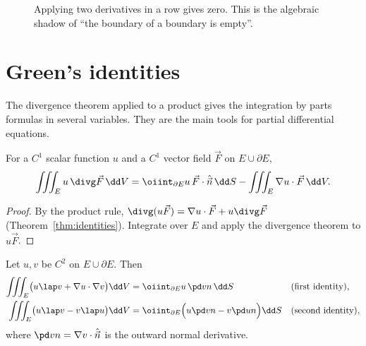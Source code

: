 \begin{figure}[ht]
\centering
{}
\caption{Applying two derivatives in a row gives zero. This is the algebraic shadow of ``the boundary of a boundary is empty''.}
\label{fig:dd0}
\end{figure}

\section{Green's identities}

The divergence theorem applied to a product gives the integration by parts formulas in several variables. They are the main tools for partial differential equations.

\begin{theorem}\label{thm:ibp}
For a $C^1$ scalar function $u$ and a $C^1$ vector field $\vec F$ on $E\cup\partial E$,
\[
\iiint_Eu\,\divg\vec F\,\dd V=\oiint_{\partial E}u\,\vec F\cdot\hat{\vec n}\,\dd S-\iiint_E\nabla u\cdot\vec F\,\dd V .
\]
\end{theorem}

\begin{proof}
By the product rule, $\divg(u\vec F)=\nabla u\cdot\vec F+u\divg\vec F$ (Theorem~\ref{thm:identities}). Integrate over $E$ and apply the divergence theorem to $u\vec F$.
\end{proof}

\begin{theorem}\label{thm:greenid}
Let $u,v$ be $C^2$ on $E\cup\partial E$. Then
\begin{align}
\iiint_E\bigl(u\lap v+\nabla u\cdot\nabla v\bigr)\dd V&=\oiint_{\partial E}u\,\pd vn\,\dd S&&\text{(first identity)},\label{eq:green1}\\
\iiint_E\bigl(u\lap v-v\lap u\bigr)\dd V&=\oiint_{\partial E}\Bigl(u\pd vn-v\pd un\Bigr)\dd S&&\text{(second identity)},\label{eq:green2}
\end{align}
where $\pd vn=\nabla v\cdot\hat{\vec n}$ is the outward normal derivative.
\end{theorem}

